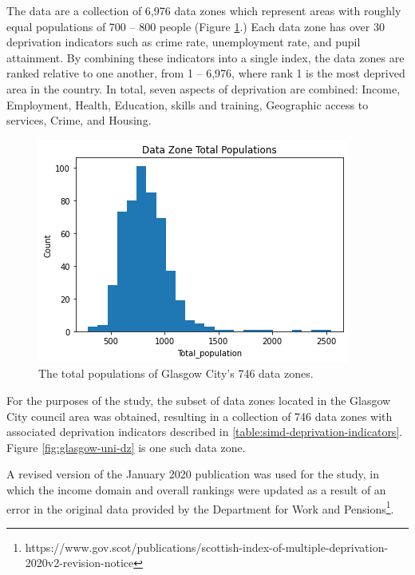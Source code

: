 \documentclass{thesis}
\begin{document}
The data are a collection of 6,976 data zones which represent areas with roughly equal populations of 700 -- 800 people (Figure \ref{fig:dz-total-populations}.) Each data zone has over 30 deprivation indicators such as crime rate, unemployment rate, and pupil attainment. By combining these indicators into a single index, the data zones are ranked relative to one another, from 1 -- 6,976, where rank 1 is the most deprived area in the country. In total, seven aspects of deprivation are combined: Income, Employment, Health, Education, skills and training, Geographic access to services, Crime, and Housing.

\begin{figure}[h]
    \centering
    \includegraphics[scale=0.75]{images/dz-total-population.png}
    \caption{The total populations of Glasgow City's 746 data zones.}
    \label{fig:dz-total-populations}
\end{figure}

For the purposes of the study, the subset of data zones located in the Glasgow City council area was obtained, resulting in a collection of 746 data zones with associated deprivation indicators described in \ref{table:simd-deprivation-indicators}. Figure \ref{fig:glasgow-uni-dz} is one such data zone.

A revised version of the January 2020 publication was used for the study, in which the income domain and overall rankings were updated as a result of an error in the original data provided by the Department for Work and Pensions\footnote{https://www.gov.scot/publications/scottish-index-of-multiple-deprivation-2020v2-revision-notice}.
\end{document}
